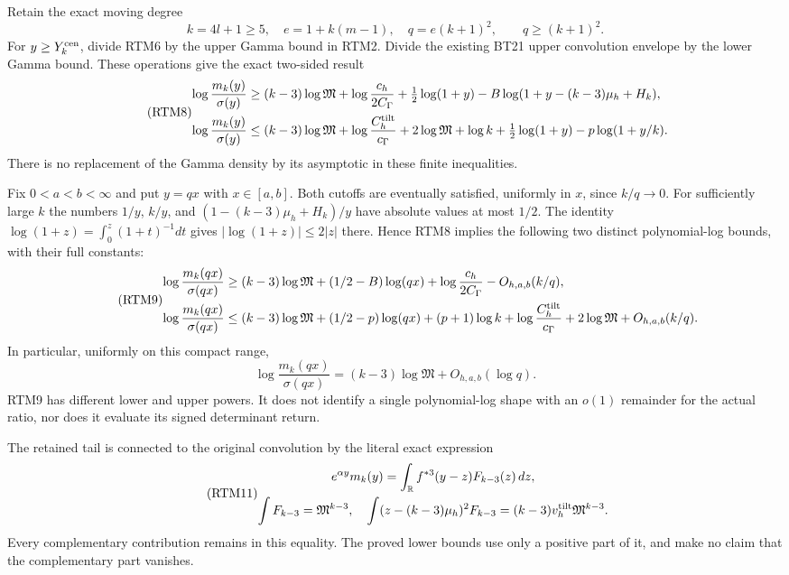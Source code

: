 \documentclass[11pt,a4paper]{article}
\begin{document}
Retain the exact moving degree
\[
 k=4l+1\ge5,\quad e=1+k(m-1),\quad q=e(k+1)^2,
 \qquad q\ge(k+1)^2.
\]
For $y\ge Y_k^{\rm cen}$, divide RTM6 by the upper Gamma bound in
RTM2.  Divide the existing BT21 upper convolution envelope by the
lower Gamma bound.  These operations give the exact two-sided result
\begin{equation}\tag{RTM8}
 \begin{aligned}
 \log\frac{m_k(y)}{\sigma(y)}\ge{}&(k-3)\log\mathfrak M
 +\log\frac{c_h}{2C_\Gamma}+\tfrac12\log(1+y)
 -B\log(1+y-(k-3)\mu_h+H_k),\\
 \log\frac{m_k(y)}{\sigma(y)}\le{}&(k-3)\log\mathfrak M
 +\log\frac{C_h^{\rm tilt}}{c_\Gamma}+2\log\mathfrak M
 +\log k+\tfrac12\log(1+y)-p\log(1+y/k).
 \end{aligned}
\end{equation}
There is no replacement of the Gamma density by its asymptotic in
these finite inequalities.

Fix $0<a<b<\infty$ and put $y=qx$ with $x\in[a,b]$.
Both cutoffs are eventually satisfied, uniformly in $x$, since
$k/q\to0$.  For sufficiently large $k$ the numbers
$1/y$, $k/y$, and $(1-(k-3)\mu_h+H_k)/y$ have absolute values at
most $1/2$.  The identity
$\log(1+z)=\int_0^z(1+t)^{-1}dt$ gives
$|\log(1+z)|\le2|z|$ there.  Hence RTM8 implies the following
two distinct polynomial-log bounds, with their full constants:
\begin{equation}\tag{RTM9}
 \begin{aligned}
 \log\frac{m_k(qx)}{\sigma(qx)}\ge{}&(k-3)\log\mathfrak M
 +(1/2-B)\log(qx)+\log\frac{c_h}{2C_\Gamma}
 -O_{h,a,b}(k/q),\\
 \log\frac{m_k(qx)}{\sigma(qx)}\le{}&(k-3)\log\mathfrak M
 +(1/2-p)\log(qx)+(p+1)\log k
 +\log\frac{C_h^{\rm tilt}}{c_\Gamma}+2\log\mathfrak M
 +O_{h,a,b}(k/q).
 \end{aligned}
\end{equation}
In particular, uniformly on this compact range,
\begin{equation}\tag{RTM10}
 \log\frac{m_k(qx)}{\sigma(qx)}
 =(k-3)\log\mathfrak M+O_{h,a,b}(\log q).
\end{equation}
RTM9 has different lower and upper powers.  It does not identify a
single polynomial-log shape with an $o(1)$ remainder for the actual
ratio, nor does it evaluate its signed determinant return.

The retained tail is connected to the original convolution by the
literal exact expression
\begin{equation}\tag{RTM11}
\begin{gathered}
 e^{\alpha y}m_k(y)=
 \int_{\mathbb R} f^{*3}(y-z)F_{k-3}(z)\,dz,\\
 \int F_{k-3}=\mathfrak M^{k-3},\quad
 \int(z-(k-3)\mu_h)^2F_{k-3}
 =(k-3)v_h^{\rm tilt}\mathfrak M^{k-3}.
\end{gathered}
\end{equation}
Every complementary contribution remains in this equality.  The
proved lower bounds use only a positive part of it, and make no
claim that the complementary part vanishes.
\end{document}
